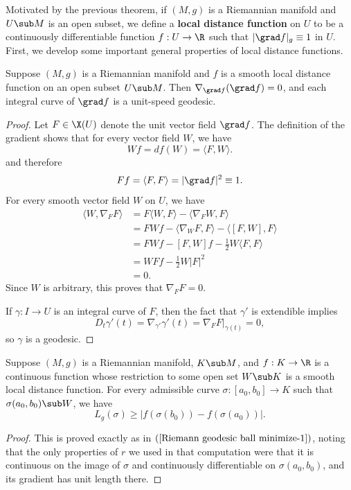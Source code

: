 Motivated by the previous theorem, if $(M,g)$ is a Riemannian manifold and $U\sub M$ is an open subset, we define a \textbf{local distance function} on $U$ to be a 
continuously differentiable function $f:U\to\R$ such that $|\grad f|_g\equiv 1$ in $U$. First, we develop some important general properties of local distance functions.
\begin{theorem}\label{Riemann local distance function int-curve geodesic}
Suppose $(M,g)$ is a Riemannian manifold and $f$ is a smooth local distance function on an open subset $U\sub M$. Then $\nabla_{\grad f}(\grad f)=0$, and each integral 
curve of $\grad f$ is a unit-speed geodesic.
\end{theorem}
\begin{proof}
Let $F\in\X(U)$ denote the unit vector field $\grad f$. The definition of the gradient shows that for every vector field $W$, we have
\[Wf=df(W)=\langle F,W\rangle.\]
and therefore
\[Ff=\langle F,F\rangle=|\grad f|^2\equiv 1.\]
For every smooth vector field $W$ on $U$, we have
\begin{align*}
\langle W,\nabla_FF\rangle&=F\langle W,F\rangle-\langle\nabla_FW,F\rangle\\
&=FWf-\langle\nabla_WF,F\rangle-\langle[F,W],F\rangle\\
&=FWf-[F,W]f-\frac{1}{2}W\langle F,F\rangle\\
&=WFf-\frac{1}{2}W|F|^2\\
&=0.
\end{align*}
Since $W$ is arbitrary, this proves that $\nabla_FF=0$.\par
If $\gamma:I\to U$ is an integral curve of $F$, then the fact that $\gamma'$ is extendible implies
\[D_t\gamma'(t)=\nabla_{\gamma'}\gamma'(t)=\nabla_FF|_{\gamma(t)}=0,\]
so $\gamma$ is a geodesic.
\end{proof}
\begin{lemma}\label{Riemann local distance function lem}
Suppose $(M,g)$ is a Riemannian manifold, $K\sub M$, and $f:K\to\R$ is a continuous function whose restriction to some open set $W\sub K$ is a smooth local distance function. 
For every admissible curve $\sigma:[a_0,b_0]\to K$ such that $\sigma(a_0,b_0)\sub W$, we have
\[L_g(\sigma)\geq|f(\sigma(b_0))-f(\sigma(a_0))|.\]
\end{lemma}
\begin{proof}
This is proved exactly as in $(\ref{Riemann geodesic ball minimize-1})$, noting that the only properties of $r$ we used in that computation were that it is continuous on the image of $\sigma$ and continuously 
differentiable on $\sigma(a_0,b_0)$, and its gradient has unit length there.
\end{proof}
